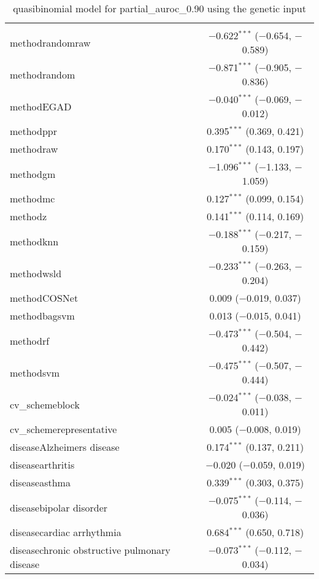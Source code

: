 
\begin{table}[!htbp] \centering 
  \caption{quasibinomial model for partial_auroc_0.90 using the genetic input} 
  \label{} 
\begin{tabular}{@{\extracolsep{5pt}}lc} 
\\[-1.8ex]\hline 
\hline \\[-1.8ex] 
 methodrandomraw & $-$0.622$^{***}$ ($-$0.654, $-$0.589) \\ 
  methodrandom & $-$0.871$^{***}$ ($-$0.905, $-$0.836) \\ 
  methodEGAD & $-$0.040$^{***}$ ($-$0.069, $-$0.012) \\ 
  methodppr & 0.395$^{***}$ (0.369, 0.421) \\ 
  methodraw & 0.170$^{***}$ (0.143, 0.197) \\ 
  methodgm & $-$1.096$^{***}$ ($-$1.133, $-$1.059) \\ 
  methodmc & 0.127$^{***}$ (0.099, 0.154) \\ 
  methodz & 0.141$^{***}$ (0.114, 0.169) \\ 
  methodknn & $-$0.188$^{***}$ ($-$0.217, $-$0.159) \\ 
  methodwsld & $-$0.233$^{***}$ ($-$0.263, $-$0.204) \\ 
  methodCOSNet & 0.009 ($-$0.019, 0.037) \\ 
  methodbagsvm & 0.013 ($-$0.015, 0.041) \\ 
  methodrf & $-$0.473$^{***}$ ($-$0.504, $-$0.442) \\ 
  methodsvm & $-$0.475$^{***}$ ($-$0.507, $-$0.444) \\ 
  cv\_schemeblock & $-$0.024$^{***}$ ($-$0.038, $-$0.011) \\ 
  cv\_schemerepresentative & 0.005 ($-$0.008, 0.019) \\ 
  diseaseAlzheimers disease & 0.174$^{***}$ (0.137, 0.211) \\ 
  diseasearthritis & $-$0.020 ($-$0.059, 0.019) \\ 
  diseaseasthma & 0.339$^{***}$ (0.303, 0.375) \\ 
  diseasebipolar disorder & $-$0.075$^{***}$ ($-$0.114, $-$0.036) \\ 
  diseasecardiac arrhythmia & 0.684$^{***}$ (0.650, 0.718) \\ 
  diseasechronic obstructive pulmonary disease & $-$0.073$^{***}$ ($-$0.112, $-$0.034) \\ 

\end{tabular}
\end{table}
